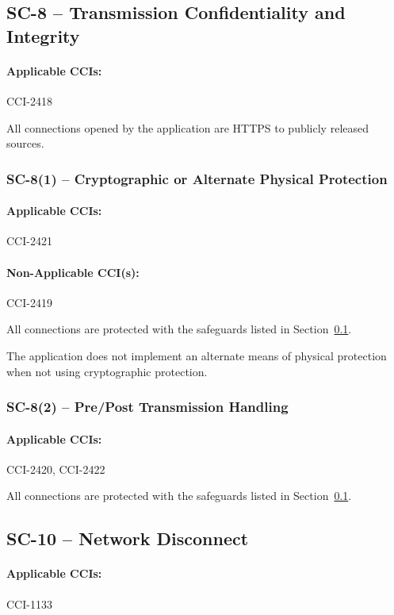 \documentclass[letterpaper, 10pt, twoside]{article}
\begin{document}
\subsection{SC-8 -- Transmission Confidentiality and Integrity}
\label{sec:sc-8}

\paragraph{Applicable CCIs:} CCI-2418

All connections opened by the application are HTTPS to publicly released sources.

\subsubsection{SC-8(1) -- Cryptographic or Alternate Physical Protection}

\paragraph{Applicable CCIs:} CCI-2421

\paragraph{Non-Applicable CCI(s):} CCI-2419

All connections are protected with the safeguards listed in Section~\ref{sec:sc-8}.

The application does not implement an alternate means of physical protection when not using cryptographic protection.

\subsubsection{SC-8(2) -- Pre/Post Transmission Handling}

\paragraph{Applicable CCIs:} CCI-2420, CCI-2422

All connections are protected with the safeguards listed in Section~\ref{sec:sc-8}.

\subsection{SC-10 -- Network Disconnect}

\paragraph{Applicable CCIs:} CCI-1133
\end{document}
